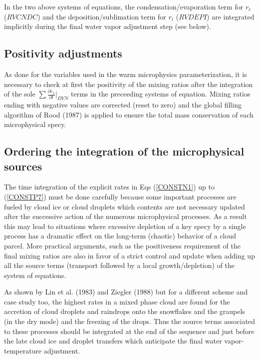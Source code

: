 In the two above systems of equations, the condensation/evaporation term for
$r_c$ ($RVCNDC$) and the deposition/sublimation term for $r_i$ ($RVDEPI$) are
integrated implicitly during the final water vapor adjustment step (see below).

%
\subsection{Positivity adjustments}
%

As done for the variables used in the warm microphysics parameterization, it is
necessary to check at first the positivity of the
mixing ratios after the integration of the sole
$\sum \frac{\displaystyle{\partial r_x}}{\displaystyle{\partial t}} \Big|_{DYN}$
terms in the preceeding systems of equation. Mixing ratios ending with negative
values are corrected (reset to zero) and the global filling algorithm of Rood
(1987) is applied to ensure the total mass conservation of each microphysical
specy.

%
\subsection{Ordering the integration of the microphysical sources}
%
The time integration of the explicit rates in Eqs (\ref{CONSTN1}) up to
(\ref{CONSTP7}) must be done carefully
because some important processes are fueled by cloud ice or cloud droplets which
contents are not necessary updated after the successive action of the numerous
microphysical processes. As a result this may lead to situations where excessive
depletion of a key specy by a single process has a dramatic effect on the
long-term (chaotic) behavior of a cloud parcel. More practical arguments, such
as the positiveness requirement of the final mixing ratios are also in favor of
a strict control and update when adding up all the source terms (transport
followed by a local growth/depletion) of the system of equations.

As shown by Lin et al. (1983) and Ziegler (1988) but for a different scheme and
case study too, the highest rates in a mixed phase cloud are found for the
accretion of cloud droplets and raindrops onto the snowflakes and the graupels
(in the dry mode)
and the freezing of the drops. Thus the source terms associated to these
processes should be integrated at the end of the sequence and just before the
late cloud ice and droplet transfers which anticipate the final water
vapor-temperature adjustment.

